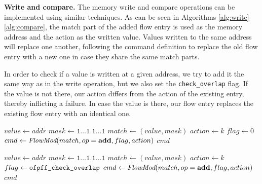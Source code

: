 \documentclass[conference]{sigcomm-alternate}
\newcommand{\concat}[0]{\cdot}
\newcommand{\compare}{compare\xspace}
\newcommand{\memwrite}{write\xspace}
\newcommand{\addr}{\textit{addr}\xspace}
\newcommand{\add}{\textbf{add}\xspace}
\newcommand{\checko}{\texttt{check\_overlap}\xspace}
\begin{document}
\vspace{1mm}
\noindent\textbf{Write and compare.}
The memory \memwrite and \compare
 operations can be implemented using similar techniques.
 As can be seen in Algorithms \ref{alg:write}-\ref{alg:compare},
  the match part of the added flow entry is used as the memory address and the action as
  the written value. Values written to the same address will replace one another,
following the command definition to replace the old flow entry with a new one in case they
share the same match parts.

In order to check if a value is written at a given address,
we try to add it the same way as in the \memwrite operation,
but we also set the \texttt{\checko} flag. If the value is not there,
our action differs from the action of the existing entry,
thereby inflicting a failure.
In case the value is there, our flow entry replaces the existing flow entry
with an identical one.


\begin{algorithm}[t]
    \caption{$\textit{write}(\addr,k)$}
    \label{alg:write}
    \begin{algorithmic}[1]
    		\State $value \gets \addr$
    		\State $mask \gets  \texttt{1$\ldots$1}. \texttt{1$\ldots$1}$
    		\State $match \gets (value,mask)$
    		\State $action \gets k$
    		\State $flag \gets 0$
    		\State $cmd\gets \emph{FlowMod}(match, op = \add, flag, action) $
			\Return $cmd$
    \end{algorithmic}
\end{algorithm}

\begin{algorithm}[t]
    \caption{$\textit{\compare}(\addr,k)$}
    \label{alg:compare}
    \begin{algorithmic}[1]
    		\State $value \gets \addr$
    		\State $mask \gets  \texttt{1$\ldots$1}.\texttt{1$\ldots$1}$
    		\State $match \gets (value,mask)$
    		\State $action \gets k$
    		\State $flag \gets \texttt{ofpff\_\checko}$
    		\State $cmd\gets \emph{FlowMod}(match, op = \add, flag, action) $
			\Return $cmd$
    \end{algorithmic}
\end{algorithm}
\end{document}
